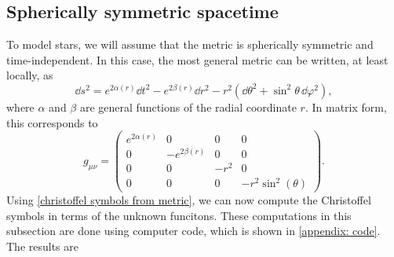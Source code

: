 \subsection*{Spherically symmetric spacetime}

To model stars, we will assume that the metric is spherically symmetric and time-independent.
In this case, the most general metric can be written, at least locally, as~\autocite{carrollSpacetimeGeometryIntroduction2019}
%
\begin{equation}
    \dd s^2 
    = e^{2\alpha(r)} \dd t^2 - e^{2 \beta(r)} \dd r^2 - 
    r^2 (\dd \theta^2 + \sin^2 \theta \, \dd \varphi^2),
\end{equation}
%
where $\alpha$ and $\beta$ are general functions of the radial coordinate $r$.
In matrix form, this corresponds to 
%
\begin{equation}
    \label{spherically symmetric metric}
    g_{\mu \nu} =
    \left(
        \begin{matrix}
            e^{2 \alpha{\left(r \right)}} & 0 & 0 & 0\\
            0 & - e^{2 \beta{\left(r \right)}} & 0 & 0
            \\0 & 0 & - r^{2} & 0
            \\0 & 0 & 0 & - r^{2} \sin^{2}{\left(\theta \right)}
        \end{matrix}
     \right).
\end{equation}
%
Using \autoref{christoffel symbols from metric}, we can now compute the Christoffel symbols in terms of the unknown funcitons.
These computations in this subsection are done using computer code, which is shown in \autoref{appendix: code}.
The results are
%
